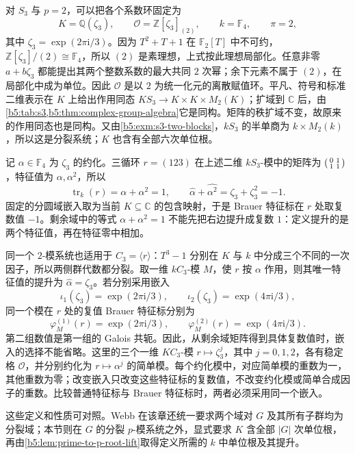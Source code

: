 对 \(S_3\) 与 \(p=2\)，可以把各个系数环固定为
\[
	K=\mathbb Q(\zeta_3),\qquad \mathcal O=\mathbb Z[\zeta_3]_{(2)},\qquad k=\mathbb F_4,\qquad \pi=2,
\]
其中 \(\zeta_3=\exp(2\pi\mathrm i/3)\)。因为 \(T^2+T+1\) 在 \(\mathbb F_2[T]\) 中不可约，\(\mathbb Z[\zeta_3]/(2)\cong\mathbb F_4\)，所以 \((2)\) 是素理想，上式按此理想局部化。任意非零 \(a+b\zeta_3\) 都能提出其两个整数系数的最大共同 \(2\) 次幂；余下元素不属于 \((2)\)，在局部化中成为单位。因此 \(\mathcal O\) 是以 \(2\) 为统一化元的离散赋值环。平凡、符号和标准二维表示在 \(K\) 上给出作用同态 \(KS_3\to K\times K\times M_2(K)\)；扩域到 \(\mathbb C\) 后，由\cref{b5:tab:s3,b5:thm:complex-group-algebra}它是同构。矩阵的秩扩域不变，故原来的作用同态也是同构。又由\cref{b5:exm:s3-two-blocks}，\(kS_3\) 的半单商为 \(k\times M_2(k)\)，所以这是分裂系统；\(K\) 也含有全部六次单位根。

\ProseParagraphBreak
记 \(\alpha\in\mathbb F_4\) 为 \(\zeta_3\) 的约化。三循环 \(r=(123)\) 在上述二维 \(kS_3\)-模中的矩阵为 \(\begin{psmallmatrix}0&1\\1&1\end{psmallmatrix}\)，特征值为 \(\alpha,\alpha^2\)，所以
\[
	\operatorname{tr}_k(r)=\alpha+\alpha^2=1,\qquad \widehat\alpha+\widehat{\alpha^2} =\zeta_3+\zeta_3^2=-1.
\]
固定的分圆域嵌入取为当前 \(K\subseteq\mathbb C\) 的包含映射，于是 Brauer 特征标在 \(r\) 处取复数值 \(-1\)。剩余域中的等式 \(\alpha+\alpha^2=1\) 不能先把右边提升成复数 \(1\)：定义提升的是两个特征值，再在特征零中相加。

\ProseParagraphBreak
同一个 \(2\)-模系统也适用于 \(C_3=\langle r\rangle\)：\(T^3-1\) 分别在 \(K\) 与 \(k\) 中分成三个不同的一次因子，所以两侧群代数都分裂。取一维 \(kC_3\)-模 \(M\)，使 \(r\) 按 \(\alpha\) 作用，则其唯一特征值的提升为 \(\widehat\alpha=\zeta_3\)。若分别采用嵌入
\[
	\iota_1(\zeta_3)=\exp(2\pi\mathrm i/3),\qquad \iota_2(\zeta_3)=\exp(4\pi\mathrm i/3),
\]
同一个模在 \(r\) 处的复值 Brauer 特征标分别为
\[
	\varphi_M^{(1)}(r)=\exp(2\pi\mathrm i/3),\qquad \varphi_M^{(2)}(r)=\exp(4\pi\mathrm i/3).
\]
第二组数值是第一组的 Galois 共轭。因此，从剩余域矩阵得到具体复数值时，嵌入的选择不能省略。这里的三个一维 \(KC_3\)-模 \(r\mapsto\zeta_3^j\)，其中 \(j=0,1,2\)，各有稳定格 \(\mathcal O\)，并分别约化为 \(r\mapsto\alpha^j\) 的简单模。每个约化模中，对应简单模的重数为一，其他重数为零；改变嵌入只改变这些特征标的复数值，不改变约化模或简单合成因子的重数。比较普通特征标与 Brauer 特征标时，两者必须采用同一个嵌入。

\ProseParagraphBreak
这些定义和性质可对照\cite[Section 10.1, Lemma 10.1.1; Proposition 10.1.3]{Webb2016FiniteGroupRepresentations}。Webb 在该章还统一要求两个域对 \(G\) 及其所有子群均为分裂域；本节则在 \(G\) 的分裂 \(p\)-模系统之外，显式要求 \(K\) 含全部 \(|G|\) 次单位根，再由\cref{b5:lem:prime-to-p-root-lift}取得定义所需的 \(k\) 中单位根及其提升。

